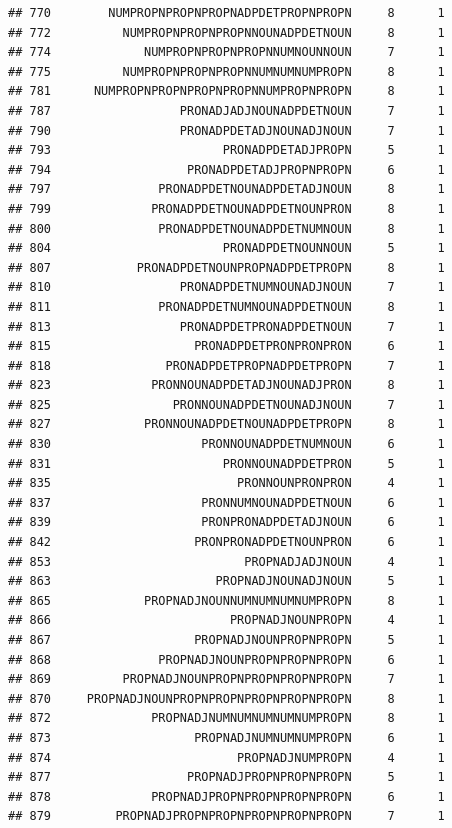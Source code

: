 \documentclass[]{article}
\begin{document}
\begin{verbatim}
## 770        NUMPROPNPROPNPROPNADPDETPROPNPROPN     8      1
## 772          NUMPROPNPROPNPROPNNOUNADPDETNOUN     8      1
## 774             NUMPROPNPROPNPROPNNUMNOUNNOUN     7      1
## 775          NUMPROPNPROPNPROPNNUMNUMNUMPROPN     8      1
## 781      NUMPROPNPROPNPROPNPROPNNUMPROPNPROPN     8      1
## 787                  PRONADJADJNOUNADPDETNOUN     7      1
## 790                  PRONADPDETADJNOUNADJNOUN     7      1
## 793                        PRONADPDETADJPROPN     5      1
## 794                   PRONADPDETADJPROPNPROPN     6      1
## 797               PRONADPDETNOUNADPDETADJNOUN     8      1
## 799              PRONADPDETNOUNADPDETNOUNPRON     8      1
## 800               PRONADPDETNOUNADPDETNUMNOUN     8      1
## 804                        PRONADPDETNOUNNOUN     5      1
## 807            PRONADPDETNOUNPROPNADPDETPROPN     8      1
## 810                  PRONADPDETNUMNOUNADJNOUN     7      1
## 811               PRONADPDETNUMNOUNADPDETNOUN     8      1
## 813                  PRONADPDETPRONADPDETNOUN     7      1
## 815                    PRONADPDETPRONPRONPRON     6      1
## 818                PRONADPDETPROPNADPDETPROPN     7      1
## 823              PRONNOUNADPDETADJNOUNADJPRON     8      1
## 825                 PRONNOUNADPDETNOUNADJNOUN     7      1
## 827             PRONNOUNADPDETNOUNADPDETPROPN     8      1
## 830                     PRONNOUNADPDETNUMNOUN     6      1
## 831                        PRONNOUNADPDETPRON     5      1
## 835                          PRONNOUNPRONPRON     4      1
## 837                     PRONNUMNOUNADPDETNOUN     6      1
## 839                     PRONPRONADPDETADJNOUN     6      1
## 842                    PRONPRONADPDETNOUNPRON     6      1
## 853                           PROPNADJADJNOUN     4      1
## 863                       PROPNADJNOUNADJNOUN     5      1
## 865             PROPNADJNOUNNUMNUMNUMNUMPROPN     8      1
## 866                         PROPNADJNOUNPROPN     4      1
## 867                    PROPNADJNOUNPROPNPROPN     5      1
## 868               PROPNADJNOUNPROPNPROPNPROPN     6      1
## 869          PROPNADJNOUNPROPNPROPNPROPNPROPN     7      1
## 870     PROPNADJNOUNPROPNPROPNPROPNPROPNPROPN     8      1
## 872              PROPNADJNUMNUMNUMNUMNUMPROPN     8      1
## 873                    PROPNADJNUMNUMNUMPROPN     6      1
## 874                          PROPNADJNUMPROPN     4      1
## 877                   PROPNADJPROPNPROPNPROPN     5      1
## 878              PROPNADJPROPNPROPNPROPNPROPN     6      1
## 879         PROPNADJPROPNPROPNPROPNPROPNPROPN     7      1

\end{verbatim}
\end{document}
